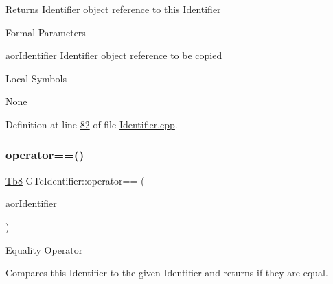 \begin{DoxyReturn}{Returns}
Identifier object reference to this Identifier
\end{DoxyReturn}
\begin{DoxyParagraph}{Formal Parameters}

\begin{DoxyPre}{\ttfamily [ in ]  aorIdentifier    Identifier object reference to be copied }\end{DoxyPre}

\end{DoxyParagraph}
\begin{DoxyParagraph}{Local Symbols}

\begin{DoxyPre}{\ttfamily  None }\end{DoxyPre}
 
\end{DoxyParagraph}


Definition at line \mbox{\hyperlink{_identifier_8cpp_source_l00082}{82}} of file \mbox{\hyperlink{_identifier_8cpp_source}{Identifier.\+cpp}}.

\mbox{\label{class_g_n_common_1_1_g_n_notification_1_1_g_tc_identifier_aad336ee2e2570c3e635d6d95a8b21abc}} 
\subsubsection{\texorpdfstring{operator==()}{operator==()}}
{\footnotesize\ttfamily \mbox{\hyperlink{namespace_g_n_common_a8115dc7ed53b6e5b52e6bfde1632ea74}{Tb8}} G\+Tc\+Identifier\+::operator== (\begin{DoxyParamCaption}\item[{const \mbox{\hyperlink{class_g_n_common_1_1_g_n_notification_1_1_g_tc_identifier}{G\+Tc\+Identifier}} \&}]{aor\+Identifier }\end{DoxyParamCaption})}

Equality Operator

Compares this Identifier to the given Identifier and returns if they are equal.

